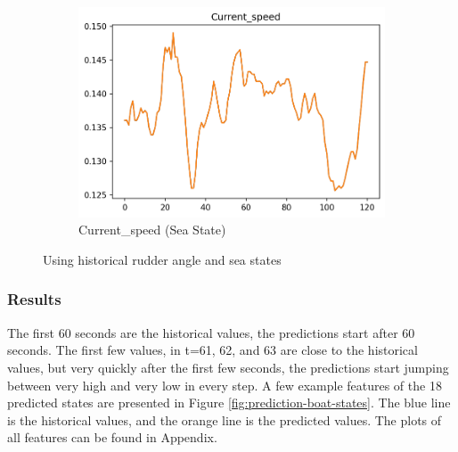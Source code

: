 \documentclass[12pt,twoside]{report}
\begin{document}
\begin{figure}[h]
\begin{subfigure}[b]{0.32\textwidth}
         \includegraphics[width=\textwidth]{figures/prediction-plots/Current_speed.png}
         \caption{Current\_speed (Sea State)}
     \end{subfigure}
        \caption{Using historical rudder angle and sea states}
        \label{fig:prediction-sea-rudder}
\end{figure}

\subsubsection{Results}
The first 60 seconds are the historical values, the predictions start after 60 seconds. The first few values, in t=61, 62, and 63 are close to the historical values, but very quickly after the first few seconds, the predictions start jumping between very high and very low in every step. A few example features of the 18 predicted states are presented in Figure \ref{fig:prediction-boat-states}. The blue line is the historical values, and the orange line is the predicted values. The plots of all features can be found in Appendix.
\end{document}
